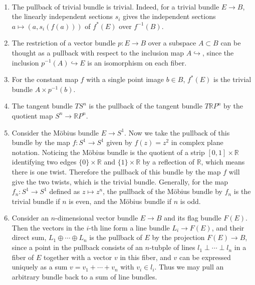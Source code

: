 \begin{exmp}
~\begin{enumerate}
\item The pullback of trivial bundle is trivial. Indeed, for a trivial bundle $E\rightarrow B$, the linearly independent sections $s_i$ gives the independent sections $a\mapsto (a,s_i(f(a)))$ of $f^*(E)$ over $f^{-1}(B)$.
\item The restriction of a vector bundle $p:E\rightarrow B$ over a subspace $A\subset B$ can be thought as a pullback with respect to the inclusion map $A\hookrightarrow$, since the inclusion $p^{-1}(A)\hookrightarrow E$ is an isomorphism on each fiber.
\item For the constant map $f$ with a single point image $b\in B$, $f^*(E)$ is the trivial bundle $A\times p^{-1}(b)$.
\item The tangent bundle $TS^n$ is the pullback of the tangent bundle $T\mathbb{R}P^n$ by the quotient map $S^n\rightarrow \mathbb{R}P^n$.
\item Consider the M{\"o}bius bundle $E\rightarrow S^1$. Now we take the pullback of this bundle by the map $f:S^1\rightarrow S^1$ given by $f(z)=z^2$ in complex plane notation. Noticing the M{\"o}bius bundle is the quotient of a strip $[0,1]\times \mathbb{R}$ identifying two edges $\{0\}\times \mathbb{R}$ and $\{1\}\times \mathbb{R}$ by a reflection of $\mathbb{R}$, which means there is one twist. Therefore the pullback of this bundle by the map $f$ will give the two twists, which is the trivial bundle. Generally, for the map $f_n:S^1\rightarrow S^1$ defined as $z\mapsto z^n$, the pullback of the M{\"o}bius bundle by $f_n$ is the trivial bundle if $n$ is even, and the M{\"o}bius bundle if $n$ is odd.
\item Consider an $n$-dimensional vector bundle $E\rightarrow B$ and its flag bundle $F(E)$. Then the vectors in the $i$-th line form a line bundle $L_i\rightarrow F(E)$, and their direct sum, $L_1\oplus\cdots\oplus L_n$ is the pullback of $E$ by the projection $F(E)\rightarrow B$, since a point in the pullback consists of an $n$-tubple of lines $l_1\perp \cdots \perp l_n$ in a fiber of $E$ together with a vector $v$ in this fiber, and $v$ can be expressed uniquely as a sum $v=v_1+\cdots+v_n$ with $v_i\in l_i$. Thus we may pull an arbitrary bundle back to a sum of line bundles.
\end{enumerate}
\end{exmp}

